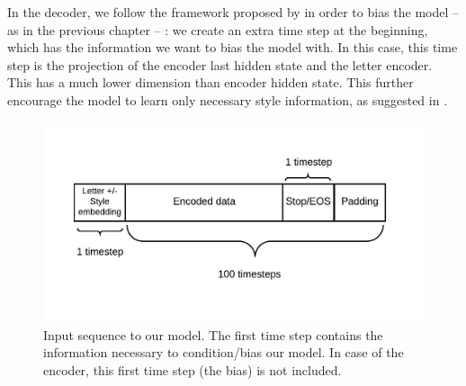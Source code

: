    \par In the decoder, we follow the framework proposed by \cite{vinyals2015show} in order to bias the model -- as in the previous chapter -- : we create an extra time step at the beginning, which has the information we want to bias the model with. In this case, this time step is the projection of the encoder last hidden state and the letter encoder. This has a much lower dimension than encoder hidden state. This further encourage the model to learn only necessary style information, as suggested in \cite{DBLP:journals/corr/abs-1803-09047}.

    \begin{figure}[htbp!]
      \centering
      \includegraphics[scale=0.7]{images/framework/input_shape.jpeg}
      \caption{Input sequence to our model. The first time step contains the information necessary to condition/bias our model. In case of the encoder, this first time step (the bias) is not included.}
      \label{fig:input_shape}
    \end{figure}

